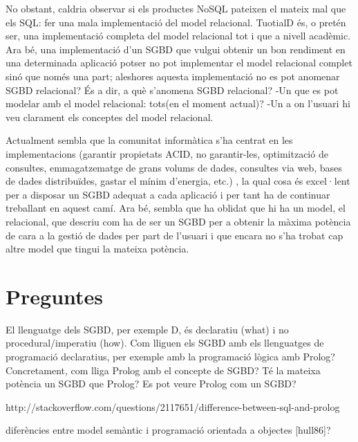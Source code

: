 No obstant, caldria observar si els productes NoSQL pateixen el mateix mal que els SQL: fer una mala implementació del model relacional. TuotialD és, o pretén ser, una implementació completa del model relacional tot i que a nivell acadèmic.
Ara bé, una implementació d'un SGBD que vulgui  obtenir un bon rendiment en una determinada aplicació potser no pot implementar el model relacional complet sinó que només una part; aleshores aquesta implementació no es pot anomenar SGBD relacional? És a dir, a què s'anomena SGBD relacional? -Un que es pot modelar amb el model relacional: tots(en el moment actual)? -Un a on l'usuari hi veu clarament els conceptes del model relacional.

Actualment sembla que la comunitat informàtica s'ha centrat en les implementacions (garantir propietats ACID, no garantir-les, optimització de consultes, emmagatzematge de grans volums de dades, consultes via web, bases de dades distribuïdes, gastar el mínim d'energia, etc.) \parencite{stonebraker07,stonebraker10}, la qual cosa és excel·lent per a disposar un SGBD adequat a cada aplicació i per tant ha de continuar treballant en aquest camí. Ara bé, sembla que ha oblidat que hi ha un model, el relacional, que descriu com ha de ser un SGBD per a obtenir la màxima potència de cara a la gestió de dades per part de l'usuari i que encara no s'ha trobat cap altre model que tingui la mateixa potència. 







\section{Preguntes}

El llenguatge dels SGBD, per exemple D, és declaratiu (what) i no procedural/imperatiu (how). Com lliguen els SGBD amb els llenguatges de programació declaratius, per exemple amb la programació lògica amb Prolog? Concretament, com lliga Prolog amb el concepte de SGBD? Té la mateixa potència un SGBD que Prolog?
 Es pot veure Prolog com un SGBD?

http://stackoverflow.com/questions/2117651/difference-between-sql-and-prolog

diferències entre model semàntic i programació orientada a objectes [hull86]?








